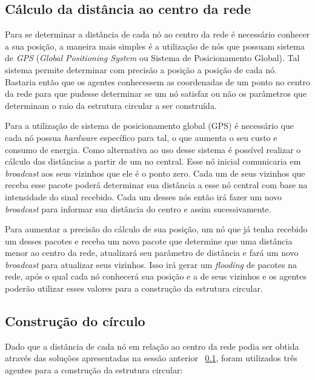 \subsection{Cálculo da distância ao centro da rede}
\label{sec:calculoDistancia}

Para se determinar a distância de cada nó ao centro da rede é necessário conhecer a sua posição, a maneira mais simples é a utilização de nós que possuam sistema de \emph{GPS} (\emph{Global Positioning System} ou Sistema de Posicionamento Global). Tal sistema permite determinar com precisão a posição a posição de cada nó. Bastaria então que os agentes conhecessem as coordenadas de um ponto no centro da rede para que pudesse determinar se um nó satisfaz ou não os parâmetros que determinam o raio da estrutura circular a ser construída.

Para a utilização de sistema de posicionamento global (GPS) é necessário que cada nó possua \emph{hardware} específico para tal, o que aumenta o seu custo e consumo de energia. Como alternativa ao uso desse sistema é possível realizar o cálculo das distâncias a partir de um no central. Esse nó inicial comunicaria em \emph{broadcast} aos seus vizinhos que ele é o ponto zero. Cada um de seus vizinhos que receba esse pacote poderá determinar sua distância a esse nó central com base na intensidade do sinal recebido.  Cada um desses nós então irá fazer um novo \emph{broadcast} para informar sua distância do centro e assim sucessivamente. 

Para aumentar a precisão do cálculo de sua posição, um nó que já tenha recebido um desses pacotes e receba um novo pacote que determine que uma distância menor ao centro da rede, atualizará seu parâmetro de distância e fará um novo \emph{broadcast} para atualizar seus vizinhos. Isso irá gerar um \emph{flooding} de pacotes na rede, após o qual cada nó conhecerá sua posição e a de seus vizinhos e os agentes poderão utilizar esses valores para a construção da estrutura circular. 

\subsection{Construção do círculo}

Dado que a distância de cada nó em relação ao centro da rede podia ser obtida através das soluções apresentadas na sessão anterior ~\ref{sec:calculoDistancia}, foram utilizados três agentes para a construção da estrutura circular: 

